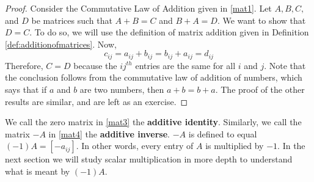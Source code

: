 \begin{proof}
Consider the Commutative Law of Addition given in \ref{mat1}. Let $A,B,C,$ and $D$ be matrices such that $A+B=C$ and 
$B+A=D.$ We want to show that $D=C$. To do so, we will use the definition of matrix addition given in Definition \ref{def:additionofmatrices}.
Now,
\begin{equation*}
c_{ij}=a_{ij}+b_{ij}=b_{ij}+a_{ij}=d_{ij}
\end{equation*}
Therefore, $C=D$ because the $ij^{th}$ entries are the same for all $i$ and $j$. Note that the
conclusion follows from the commutative law of addition of numbers, which says that if $a$ and $b$ are two numbers,
then $a+b = b+a$. 
The proof of the other results are similar, and are left as an exercise.
\end{proof}

We call the zero matrix in \ref{mat3} the \textbf{additive identity}. Similarly, we call the matrix $-A$
in \ref{mat4} the \textbf{additive inverse}. $-A$ is 
defined to equal $\left( -1\right) A = [-a_{ij}].$ In other words, every entry of $A$ is multiplied by $-1$.
In the next section we will study scalar multiplication in more depth 
to understand what is meant by  $\left( -1\right) A.$
